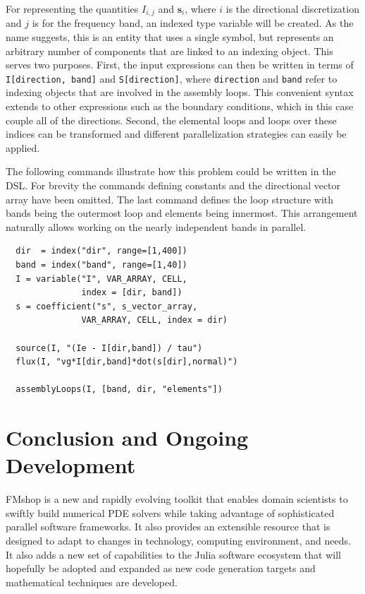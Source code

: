 \documentclass[twoside,leqno,twocolumn]{article}
\begin{document}
For representing the quantities $I_{i,j}$ and $\textbf{s}_{i}$, where $i$ is the directional discretization and $j$ is for the frequency band, an indexed type variable will be created. As the name suggests, this is an entity that uses a single symbol, but represents an arbitrary number of components that are linked to an indexing object. This serves two purposes. First, the input expressions can then be written in terms of \texttt{I[direction, band]} and \texttt{S[direction]}, where \texttt{direction} and \texttt{band} refer to indexing objects that are involved in the assembly loops. This convenient syntax extends to other expressions such as the boundary conditions, which in this case couple all of the directions. Second, the elemental loops and loops over these indices can be transformed and different parallelization strategies can easily be applied.

The following commands illustrate how this problem could be written in the DSL. For brevity the commands defining constants and the directional vector array have been omitted. The last command defines the loop structure with bands being the outermost loop and elements being innermost. This arrangement naturally allows working on the nearly independent bands in parallel.
\begin{verbatim}
  dir  = index("dir", range=[1,400])
  band = index("band", range=[1,40])
  I = variable("I", VAR_ARRAY, CELL, 
               index = [dir, band])
  s = coefficient("s", s_vector_array, 
               VAR_ARRAY, CELL, index = dir)

  source(I, "(Ie - I[dir,band]) / tau")
  flux(I, "vg*I[dir,band]*dot(s[dir],normal)")

  assemblyLoops(I, [band, dir, "elements"])
\end{verbatim}

\section{Conclusion and Ongoing Development}
FMshop is a new and rapidly evolving toolkit that enables domain scientists to swiftly build numerical PDE solvers while taking advantage of sophisticated parallel software frameworks. It also provides an extensible resource that is designed to adapt to changes in technology, computing environment, and needs. It also adds a new set of capabilities to the Julia software ecosystem that will hopefully be adopted and expanded as new code generation targets and mathematical techniques are developed.
\end{document}
